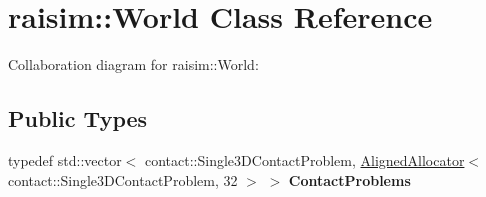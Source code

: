 \hypertarget{classraisim_1_1World}{}\section{raisim\+:\+:World Class Reference}
\label{classraisim_1_1World}


Collaboration diagram for raisim\+:\+:World\+:
\subsection*{Public Types}
\begin{DoxyCompactItemize}
\item 
\mbox{\label{classraisim_1_1World_a3be1f157bf3624a49e673b8393d0850e}} 
typedef std\+::vector$<$ contact\+::\+Single3\+D\+Contact\+Problem, \hyperlink{classraisim_1_1AlignedAllocator}{Aligned\+Allocator}$<$ contact\+::\+Single3\+D\+Contact\+Problem, 32 $>$ $>$ {\bfseries Contact\+Problems}
\end{DoxyCompactItemize}
